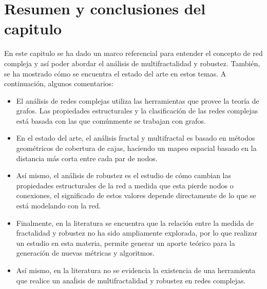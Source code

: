 \section{Resumen y conclusiones del capitulo}

En este capitulo se ha dado un marco referencial para entender el concepto de red compleja y así poder abordar el análisis de multifractalidad y robustez. También, se ha mostrado cómo se encuentra el estado del arte en estos temas. A continuación, algunos comentarios:

\begin{itemize}
    \item El análisis de redes complejas utiliza las herramientas que provee la teoría de grafos. Las propiedades estructurales y la clasificación de las redes complejas está basada con las que comúnmente se trabajan con grafos.
    \item En el estado del arte, el análisis fractal y multifractal es basado en métodos geométricos de cobertura de cajas, haciendo un mapeo espacial basado en la distancia más corta entre cada par de nodos.
    \item Así mismo, el análisis de robustez es el estudio de cómo cambian las propiedades estructurales de la red a medida que esta pierde nodos o conexiones, el significado de estos valores depende directamente de lo que se está modelando con la red.
    \item Finalmente, en la literatura se encuentra que la relación entre la medida de fractalidad y robustez no ha sido ampliamente explorada, por lo que realizar un estudio en esta materia, permite generar un aporte teórico para la generación de nuevas métricas y algoritmos.
    \item Así mismo, en la literatura no se evidencia la existencia de una herramienta que realice un anaĺisis de multifractalidad y robustez en redes complejas.
\end{itemize}